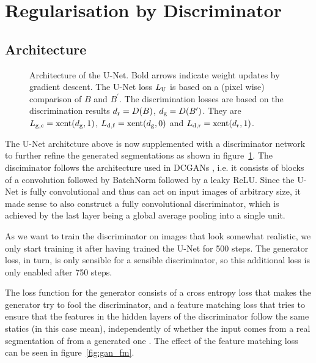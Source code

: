 \documentclass[aps,prl,twocolumn,groupedaddress,amsmath,amssymb]{revtex4-1}
\begin{document}
    \section{Regularisation by Discriminator}

    \subsection{Architecture}
    \begin{figure}[tbp]
        \begin{center}
        
        \end{center}
        \caption{Architecture of the U-Net. Bold arrows indicate weight updates by gradient descent. 
        The U-Net loss $L_{\mathrm{U}}$ is based on a (pixel wise) comparison of $B$ and $B^{\prime}$. The
        discrimination losses are based on the discrimination results $d_{\mathrm{r}} = D(B)$, 
        $d_{\mathrm{g}}=D(B^{\prime})$. They are $L_{\mathrm{g, c}} = \mathrm{xent}(d_{\mathrm{g}}, 1)$, 
        $L_{\mathrm{d, f}} = \mathrm{xent}(d_{\mathrm{g}}, 0)$ and $L_{\mathrm{d, r}} = \mathrm{xent}(d_{\mathrm{r}}, 1)$.}
        \label{fig:unet_dics}
    \end{figure}
    
    The U-Net architcture above is now supplemented with a discriminator network to further refine
    the generated segmentations as shown in figure~\ref{fig:unet_dics}. The disciminator follows the
    architecture used in DCGANs \cite{dcgan}, i.e. it consists of blocks of a convolution followed
    by BatchNorm followed by a leaky ReLU. Since the U-Net is fully convolutional and thus can act
    on input images of arbitrary size, it made sense to also construct a fully convolutional
    discriminator, which is achieved by the last layer being a global average pooling into a single
    unit.

    As we want to train the discriminator on images that look somewhat realistic, 
    we only start training it after having trained the U-Net for 500 steps. The generator loss, in 
    turn, is only sensible for a sensible discriminator, so this additional loss is only enabled 
    after 750 steps. 

    The loss function for the generator consists of a cross entropy loss that makes the generator
    try to fool the discriminator, and a feature matching loss that tries to ensure that the
    features in the hidden layers of the discriminator follow the same statics (in this case mean),
    independently of whether the input comes from a real segmentation of from a generated one
    \cite{salimans2016improved}. The effect of the feature matching loss can be seen in 
    figure~\ref{fig:gan_fm}. 
\end{document}
